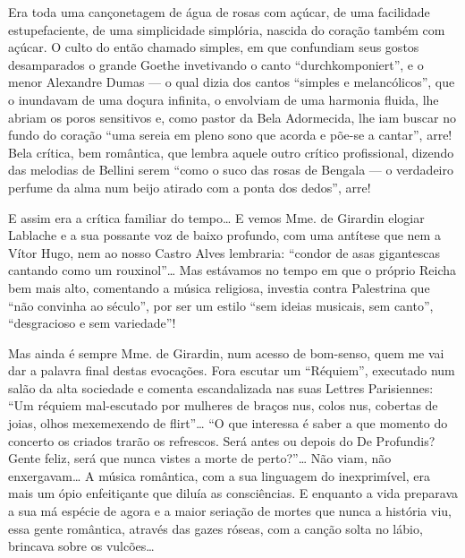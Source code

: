 Era toda uma cançonetagem de água de rosas com açúcar, de uma facilidade
estupefaciente, de uma simplicidade simplória, nascida do coração também
com açúcar. O culto do então chamado simples, em que confundiam seus
gostos desamparados o grande Goethe invetivando o canto
``durchkomponiert'', e o menor Alexandre Dumas --- o qual dizia dos
cantos ``simples e melancólicos'', que o inundavam de uma doçura
infinita, o envolviam de uma harmonia fluida, lhe abriam os poros
sensitivos e, como pastor da Bela Adormecida, lhe iam buscar no fundo do
coração ``uma sereia em pleno sono que acorda e põe-se a cantar'', arre!
Bela crítica, bem romântica, que lembra aquele outro crítico
profissional, dizendo das melodias de Bellini serem ``como o suco das
rosas de Bengala --- o verdadeiro perfume da alma num beijo atirado com a
ponta dos dedos'', arre!

E assim era a crítica familiar do tempo\ldots{} E vemos Mme. de Girardin
elogiar Lablache e a sua possante voz de baixo profundo, com uma
antítese que nem a Vítor Hugo, nem ao nosso Castro Alves lembraria:
``condor de asas gigantescas cantando como um rouxinol''\ldots{} Mas
estávamos no tempo em que o próprio Reicha bem mais alto, comentando a
música religiosa, investia contra Palestrina que ``não convinha ao
século'', por ser um estilo ``sem ideias musicais, sem canto'',
``desgracioso e sem variedade''!

Mas ainda é sempre Mme. de Girardin, num acesso de bom-senso, quem me
vai dar a palavra final destas evocações. Fora escutar um ``Réquiem'',
executado num salão da alta sociedade e comenta escandalizada nas suas
Lettres Parisiennes: ``Um réquiem mal-escutado por mulheres de braços
nus, colos nus, cobertas de joias, olhos mexemexendo de flirt''\ldots{} ``O
que interessa é saber a que momento do concerto os criados trarão os
refrescos. Será antes ou depois do De Profundis? Gente feliz, será que
nunca vistes a morte de perto?''\ldots{} Não viam, não enxergavam\ldots{} A música
romântica, com a sua linguagem do inexprimível, era mais um ópio
enfeitiçante que diluía as consciências. E enquanto a vida preparava a
sua má espécie de agora e a maior seriação de mortes que nunca a
história viu, essa gente romântica, através das gazes róseas, com a
canção solta no lábio, brincava sobre os vulcões\ldots{}



